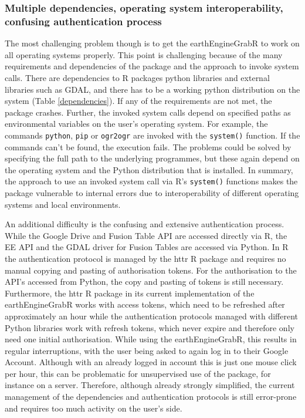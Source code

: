 \subsubsection{Multiple dependencies, operating system interoperability, confusing authentication process}

The most challenging problem though is to get the earthEngineGrabR to work on all operating systems properly. This point is challenging because of the many requirements and dependencies of the package and the approach to invoke system calls. There are dependencies to R packages python libraries and external libraries such as GDAL, and there has to be a working python distribution on the system (Table \ref{dependencies}). If any of the requirements are not met, the package crashes. 
Further, the invoked system calls depend on specified paths as environmental variables on the user's operating system. For example, the commands \texttt{python}, \texttt{pip} or \texttt{ogr2ogr} are invoked with the \texttt{system()} function. If the commands can't be found, the execution fails. The problems could be solved by specifying the full path to the underlying programmes, but these again depend on the operating system and the Python distribution that is installed. In summary, the approach to use an invoked system call via R's \texttt{system()} functions makes the package vulnerable to internal errors due to interoperability of different operating systems and local environments.

An additional difficulty is the confusing and extensive authentication process. While the Google Drive and Fusion Table API are accessed directly via R, the EE API and the GDAL driver for Fusion Tables are accessed via Python. In R the authentication protocol is managed by the httr R package and requires no manual copying and pasting of authorisation tokens. For the authorisation to the API's accessed from Python, the copy and pasting of tokens is still necessary. 
Furthermore, the httr R package in its current implementation of the earthEngineGrabR works with access tokens, which need to be refreshed after approximately an hour while the authentication protocols managed with different Python libraries work with refresh tokens, which never expire and therefore only need one initial authorisation. While using the earthEngineGrabR, this results in regular interruptions, with the user being asked to again log in to their Google Account. Although with an already logged in account this is just one mouse click per hour, this can be problematic for unsupervised use of the package, for instance on a  server. Therefore, although already strongly simplified, the current management of the dependencies and authentication protocols is still error-prone and requires too much activity on the user's side.

